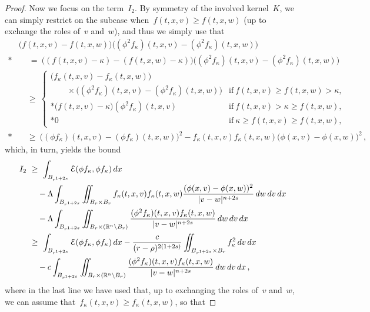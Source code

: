 \documentclass[leqno,10pt]{amsart}
\theoremstyle{plain}
\theoremstyle{remark}
\numberwithin{equation}{section}
\def\dx{\,{\rm d}x}
\def\dv{\,{\rm d}v}
\def\dw{\,{\rm d}w}
\def\ern{\mathbb{R}^n}
\newcommand{\Ec}{\mathcal{E}}
\newcommand{\snr}[1]{\lvert #1\rvert}
\newcommand{\kk}{\kappa}
\begin{document}
{\begin{proof}
	Now we focus on the term~$I_2$. By symmetry of the involved kernel~$K$, we can simply restrict on the subcase when~$f(t,x,v) \geq f(t,x,w)$ \big(up to exchange the roles of~$v$ and~$w$\big), and thus we simply use that
	\[
    \begin{aligned}
			&   \big(f(t,x,v)-f(t,x,w)\big)\big((\phi^2f_\kk)(t,x,v)-(\phi^2f_\kk)(t,x,w)\big)\\*
			& \quad \ = \   \big((f(t,x,v)-\kk)-(f(t,x,w)-\kk)\big)\big((\phi^2f_\kk)(t,x,v)-(\phi^2f_\kk)(t,x,w)\big)\\
			& \quad \geq \
			\begin{cases}
				\big(f_\kk(t,x,v)-f_\kk(t,x,w)\big)\\
                \qquad\times \big((\phi^2f_\kk)(t,x,v)-(\phi^2f_\kk)(t,x,w)\big)  & \text{if}~f(t,x,v) \geq f(t,x,w) > \kk,\\*
				\big (f(t,x,v) - \kk\big)(\phi^2f_\kk)(t,x,v) & \text{if}~f(t,x,v) >\kk \geq f(t,x,w),\\*
				0 & \text{if}~\kk \geq f(t,x,v) \geq f(t,x,w),
			\end{cases}     \\*
			& \quad \geq \ 
			\big((\phi f_\kk)(t,x,v)-(\phi f_\kk)(t,x,w)\big) ^2 -f_\kk(t,x,v)f_\kk(t,x,w)\big(\phi(x,v)-\phi(x,w)\big)^2\,,     
    \end{aligned}
	\]
	which, in turn, yields the bound
	\begin{equation}\label{eq:energy-0}
		\begin{aligned}
		I_2
		& \ \geq  \   \int_{B_{{r}^{1+2s}}} \Ec(\phi f_\kk,\phi f_\kk)\dx \\
		&  \quad \ -  \Lambda\int_{B_{{r}^{1+2s}}}\iint_{B_r \times B_r}f_\kk(t,x,v)f_\kk(t,x,w)\frac{(\phi(x,v)-\phi(x,w))^2}{\snr{v-w}^{n+2s}}\dw\dv\dx\\
		& \quad \ -  \Lambda\int_{B_{{r}^{1+2s}}}\iint_{B_r \times (\ern \setminus B_r)}\frac{(\phi^2f_\kk)(t,x,v)f_\kk(t,x,w)}{\snr{v-w}^{n+2s}}\dw\dv\dx\\
		& \ \geq \ \int_{B_{{r}^{1+2s}}} \Ec(\phi f_\kk,\phi f_\kk)\dx -  \frac{c}{({r}-{\rho})^{2(1+2s)}}\iint_{B_{r^{1+2s}}\times B_r}f_\kk^2 \dv \dx\\
		& \quad \ -  c\int_{B_{{r}^{1+2s}}}\iint_{B_r \times (\ern \setminus B_r)}\frac{(\phi^2 f_\kk)(t,x,v)f_\kk(t,x,w)}{\snr{v-w}^{n+2s}}\dw\dv\dx\,,
        \end{aligned}
	\end{equation}
where in the last line we have used that, 
 up to exchanging the roles of~$v$ and~$w$, we can assume that~$f_\kk(t,x,v) \geq f_\kk(t,x,w)$, so that

\end{proof}}
\end{document}
